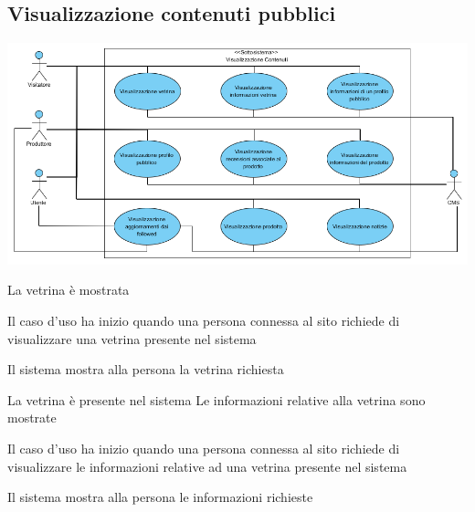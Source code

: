 \subsection{Visualizzazione contenuti pubblici}
\begin{center}
   \includegraphics[width=\textwidth]{assets/visualParadigm/Visualizzazione}
\end{center}
{La vetrina è mostrata}
{\begin{enumCU}
	\item Il caso d'uso ha inizio quando una persona connessa al sito richiede di visualizzare una vetrina presente nel sistema
	\item Il sistema mostra alla persona la vetrina richiesta
\end{enumCU}}

\tabcuvspace

{La vetrina è presente nel sistema}
{Le informazioni relative alla vetrina sono mostrate}
{\begin{enumCU}
	\item Il caso d'uso ha inizio quando una persona connessa al sito richiede di visualizzare le informazioni relative ad una vetrina presente nel sistema
	\item Il sistema mostra alla persona le informazioni richieste
\end{enumCU}}

%

